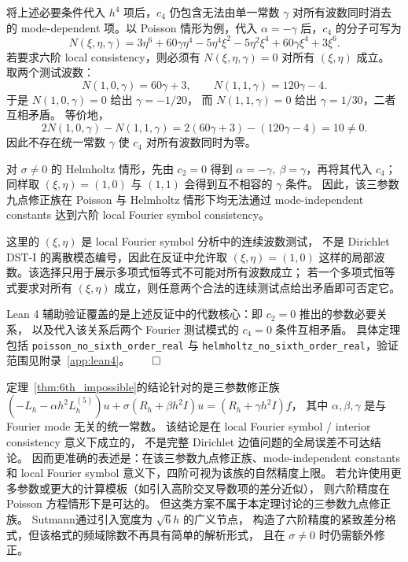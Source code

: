 \begin{theorem}
  将上述必要条件代入 $h^4$ 项后，$c_4$ 仍包含无法由单一常数 $\gamma$ 对所有波数同时消去的
  mode-dependent 项。以 Poisson 情形为例，代入 $\alpha=-\gamma$ 后，$c_4$ 的分子可写为
  \begin{equation}
    N(\xi,\eta,\gamma)
    =
    3\eta^6
    +60\gamma\eta^4
    -5\eta^4\xi^2
    -5\eta^2\xi^4
    +60\gamma\xi^4
    +3\xi^6.
  \end{equation}
  若要求六阶 local consistency，则必须有 $N(\xi,\eta,\gamma)=0$ 对所有 $(\xi,\eta)$ 成立。
  取两个测试波数：
  \[
    N(1,0,\gamma)=60\gamma+3,\qquad
    N(1,1,\gamma)=120\gamma-4.
  \]
  于是 $N(1,0,\gamma)=0$ 给出 $\gamma=-1/20$，
  而 $N(1,1,\gamma)=0$ 给出 $\gamma=1/30$，二者互相矛盾。
  等价地，
  \[
    2N(1,0,\gamma)-N(1,1,\gamma)
    =
    2(60\gamma+3)-(120\gamma-4)
    =
    10\neq 0.
  \]
  因此不存在统一常数 $\gamma$ 使 $c_4$ 对所有波数同时为零。

  对 $\sigma\neq 0$ 的 Helmholtz 情形，先由 $c_2=0$ 得到
  $\alpha=-\gamma,\ \beta=\gamma$，再将其代入 $c_4$；同样取
  $(\xi,\eta)=(1,0)$ 与 $(1,1)$ 会得到互不相容的 $\gamma$ 条件。
  因此，该三参数九点修正族在 Poisson 与 Helmholtz 情形下均无法通过
  mode-independent constants 达到六阶 local Fourier symbol consistency。

  这里的 $(\xi,\eta)$ 是 local Fourier symbol 分析中的连续波数测试，
  不是 Dirichlet DST-I 的离散模态编号，因此在反证中允许取
  $(\xi,\eta)=(1,0)$ 这样的局部波数。该选择只用于展示多项式恒等式不可能对所有波数成立；
  若一个多项式恒等式要求对所有 $(\xi,\eta)$ 成立，则任意两个合法的连续测试点给出矛盾即可否定它。

  Lean 4 辅助验证覆盖的是上述反证中的代数核心：即 $c_2=0$ 推出的参数必要关系，
  以及代入该关系后两个 Fourier 测试模式的 $c_4=0$ 条件互相矛盾。
  具体定理包括 \texttt{poisson\_no\_sixth\_order\_real} 与
  \texttt{helmholtz\_no\_sixth\_order\_real}，验证范围见附录~\ref{app:lean4}。$\qed$
\end{theorem}

\begin{remark}
  定理~\ref{thm:6th_impossible}的结论针对的是三参数修正族
  $(-L_h - \alpha h^2 L_h^{(5)})u + \sigma(R_h+\beta h^2 I)u = (R_h+\gamma h^2 I)f$，
  其中 $\alpha,\beta,\gamma$ 是与 Fourier mode 无关的统一常数。
  该结论是在 local Fourier symbol / interior consistency 意义下成立的，
  不是完整 Dirichlet 边值问题的全局误差不可达结论。
  因而更准确的表述是：在该三参数九点修正族、mode-independent constants
  和 local Fourier symbol 意义下，四阶可视为该族的自然精度上限。
  若允许使用更多参数或更大的计算模板（如引入高阶交叉导数项的差分近似），
  则六阶精度在 Poisson 方程情形下是可达的\cite{Sutmann2007}。
  但这类方案不属于本定理讨论的三参数九点修正族。
  Sutmann\cite{Sutmann2007}通过引入宽度为 $\sqrt{6}h$ 的广义节点，
  构造了六阶精度的紧致差分格式，但该格式的频域除数不再具有简单的解析形式，
  且在 $\sigma \neq 0$ 时仍需额外修正。
\end{remark}


